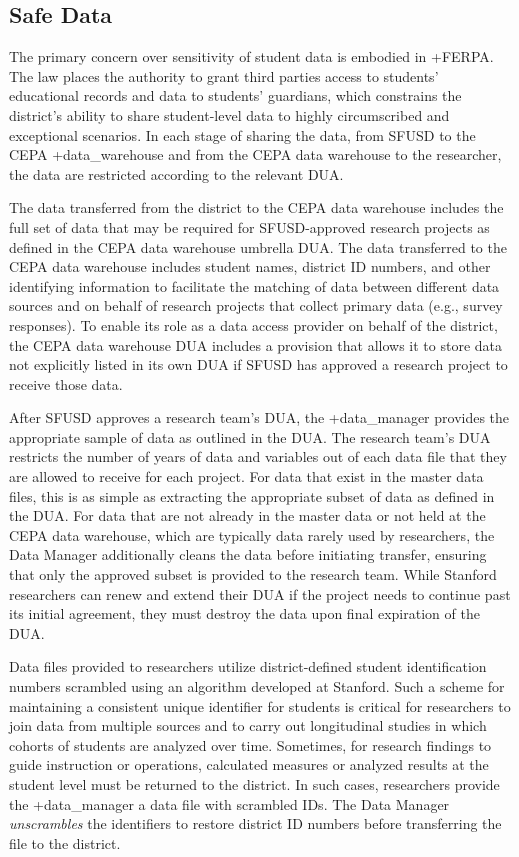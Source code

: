 \documentclass[
]{book}
\begin{document}
\hypertarget{safe-data-5}{%
\subsection{Safe Data}\label{safe-data-5}}

The primary concern over sensitivity of student data is embodied in +FERPA\textbar. The law places the authority to grant third parties access to students' educational records and data to students' guardians, which constrains the district's ability to share student-level data to highly circumscribed and exceptional scenarios. In each stage of sharing the data, from SFUSD to the CEPA +data\_warehouse\textbar{} and from the CEPA data warehouse to the researcher, the data are restricted according to the relevant DUA.

The data transferred from the district to the CEPA data warehouse includes the full set of data that may be required for SFUSD-approved research projects as defined in the CEPA data warehouse umbrella DUA. The data transferred to the CEPA data warehouse includes student names, district ID numbers, and other identifying information to facilitate the matching of data between different data sources and on behalf of research projects that collect primary data (e.g., survey responses). To enable its role as a data access provider on behalf of the district, the CEPA data warehouse DUA includes a provision that allows it to store data not explicitly listed in its own DUA if SFUSD has approved a research project to receive those data.

After SFUSD approves a research team's DUA, the +data\_manager\textbar{} provides the appropriate sample of data as outlined in the DUA. The research team's DUA restricts the number of years of data and variables out of each data file that they are allowed to receive for each project. For data that exist in the master data files, this is as simple as extracting the appropriate subset of data as defined in the DUA. For data that are not already in the master data or not held at the CEPA data warehouse, which are typically data rarely used by researchers, the Data Manager additionally cleans the data before initiating transfer, ensuring that only the approved subset is provided to the research team. While Stanford researchers can renew and extend their DUA if the project needs to continue past its initial agreement, they must destroy the data upon final expiration of the DUA.

Data files provided to researchers utilize district-defined student identification numbers scrambled using an algorithm developed at Stanford. Such a scheme for maintaining a consistent unique identifier for students is critical for researchers to join data from multiple sources and to carry out longitudinal studies in which cohorts of students are analyzed over time. Sometimes, for research findings to guide instruction or operations, calculated measures or analyzed results at the student level must be returned to the district. In such cases, researchers provide the +data\_manager\textbar{} a data file with scrambled IDs. The Data Manager \emph{unscrambles} the identifiers to restore district ID numbers before transferring the file to the district.
\end{document}
